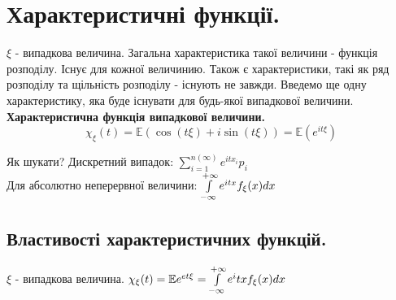 \section{Характеристичні функції.}

$\xi$ - випадкова величина. Загальна характеристика такої величини - функція розподілу. Існує для кожної величинию. Також є характеристики, такі як ряд розподілу та щільність розподілу - існують не завжди. Введемо ще одну характеристику, яка буде існувати для будь-якої випадкової величини.\\
\bd
\textbf{Характеристична функція випадкової величини.}
$$
\chi_ \xi (t) = \mathbb{E}(\cos{(t \xi)} + i \sin{(t \xi)}   ) =  \mathbb{E}( e^{ it \xi})
$$
\begin{center}
\end{center}
\ed
Як шукати? Дискретний випадок: $  \sum\limits_{i = 1}^{ n(\infty)}{ e^{itx_i}p_i}$\\
Для абсолютно неперервної величини: $  \int\limits_{-\infty}^{ +\infty}{ e^{itx}f_ \xi (x)dx}$

\subsection{Властивості характеристичних функцій.}

$\xi$ - випадкова величина. $\chi_ \xi(t) = \mathbb{E} e^{et \xi} =  \int\limits_{-\infty}^{ +\infty}{ e^itx f_{\xi}(x)dx}$\\

